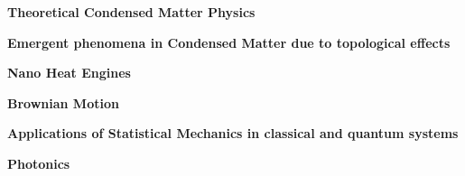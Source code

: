

\begin{cventries}

  \cventry
    {} %
    {} %
    {} %
    {} %
    {
      \begin{cvitems} %
        \item {\textbf{Theoretical Condensed Matter Physics}}
        \item {\textbf{Emergent phenomena in Condensed Matter due to topological effects}}
        \item {\textbf{Nano Heat Engines}}
        \item {\textbf{Brownian Motion}}
        \item {\textbf{Applications of Statistical Mechanics in classical and quantum systems}}
        \item {\textbf{Photonics}}
      \end{cvitems}
    }

\end{cventries}
